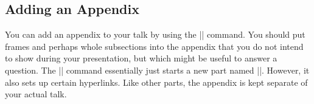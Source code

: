 \subsection{Adding an Appendix}

You can add an appendix to your talk by using the |\appendix|
command. You should put frames and perhaps whole subsections into the
appendix that you do not intend to show during your presentation, but
which might be useful to answer a question. The |\appendix| command
essentially just starts a new part named |\appendixname|. However, it
also sets up certain hyperlinks.
Like other parts, the appendix is kept separate of your actual
talk.





